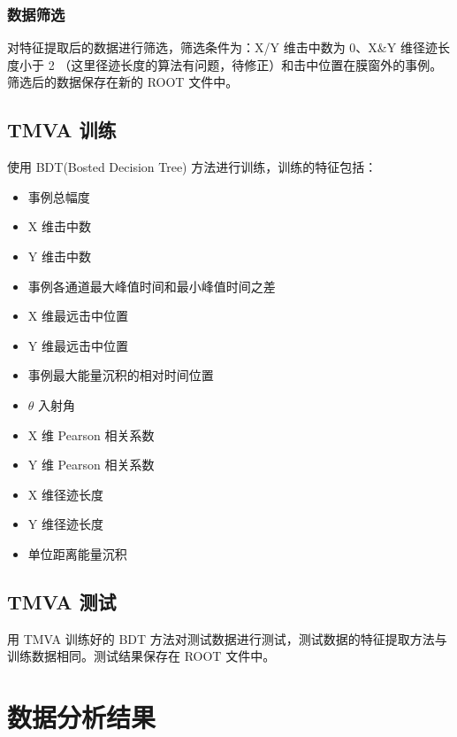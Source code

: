 \subsubsection{数据筛选}
对特征提取后的数据进行筛选，筛选条件为：X/Y 维击中数为 0、X\&Y 维径迹长度小于 2 （这里径迹长度的算法有问题，待修正）和击中位置在膜窗外的事例。筛选后的数据保存在新的 ROOT 文件中。

\subsection{TMVA 训练}
使用 BDT(Bosted Decision Tree) 方法进行训练，训练的特征包括：
\begin{itemize}
    \item 事例总幅度
    \item X 维击中数
    \item Y 维击中数
    \item 事例各通道最大峰值时间和最小峰值时间之差
    \item X 维最远击中位置
    \item Y 维最远击中位置
    \item 事例最大能量沉积的相对时间位置
    \item $\theta$ 入射角
    \item X 维 Pearson 相关系数
    \item Y 维 Pearson 相关系数
    \item X 维径迹长度
    \item Y 维径迹长度
    \item 单位距离能量沉积
\end{itemize}

\subsection{TMVA 测试}
用 TMVA 训练好的 BDT 方法对测试数据进行测试，测试数据的特征提取方法与训练数据相同。测试结果保存在 ROOT 文件中。

\section{数据分析结果}

